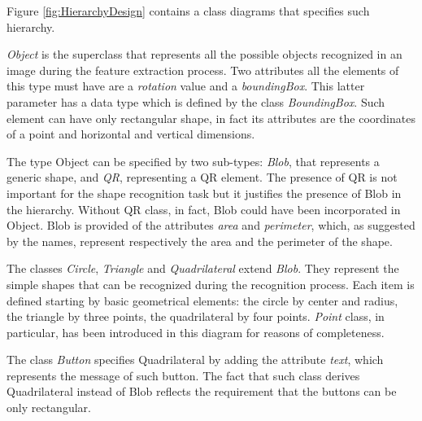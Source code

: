 	Figure \ref{fig:HierarchyDesign} contains a class diagrams that specifies such hierarchy. 

	\emph{Object} is the superclass that represents all the possible objects recognized in an image during the feature extraction process. Two attributes all the elements of this type must have are a \emph{rotation} value and a 
\emph{boundingBox}. 
	This latter parameter has a data type which is defined by the class \emph{BoundingBox}. Such element can have only rectangular shape, in fact its attributes are the coordinates of a point and horizontal and vertical dimensions.


	The type Object can be specified by two sub-types: \emph{Blob}, that represents a generic shape, and \emph{QR}, representing a \mbox{QR} element. The presence of \mbox{QR} is not important for the shape recognition task but it justifies the presence of Blob in the hierarchy. Without \mbox{QR} class, in fact, Blob could have been incorporated in Object.
	Blob is provided of the attributes \emph{area} and \emph{perimeter}, which, as suggested by the names, represent respectively the area and the perimeter of the shape.
	

	The classes \emph{Circle}, \emph{Triangle} and \emph{Quadrilateral} extend \emph{Blob}. They represent the simple shapes that can be recognized during the recognition process. Each item is defined starting by basic geometrical elements: the circle by center and radius, the triangle by three points, the quadrilateral by four points. \emph{Point} class, in particular, has been introduced in this diagram for reasons of completeness. 

	The class \emph{Button} specifies Quadrilateral by adding the attribute \emph{text}, which represents the message of such button. The fact that such class derives Quadrilateral instead of Blob reflects the requirement that the buttons can be only rectangular. 
	
